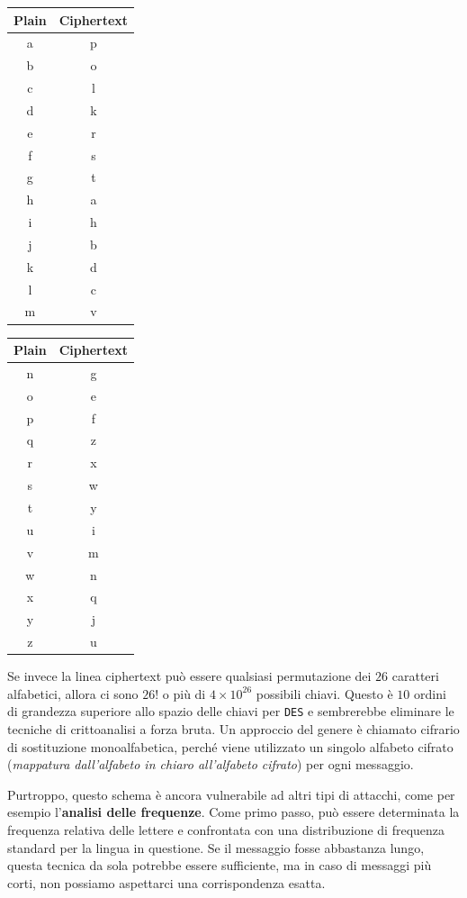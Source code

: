 \begin{center}
\begin{tabular}{|c|c|}
\hline
\textbf{Plain} & \textbf{Ciphertext} \\
\hline
    a & p \\
    b & o \\
    c & l \\
    d & k \\
    e & r \\
    f & s \\
    g & t \\
    h & a \\
    i & h \\
    j & b \\
    k & d \\
    l & c \\
    m & v \\
\hline
\end{tabular}
\hspace{2cm}
\begin{tabular}{|c|c|}
\hline
\textbf{Plain} & \textbf{Ciphertext} \\
\hline
    n & g \\
    o & e \\
    p & f \\
    q & z \\
    r & x \\
    s & w \\
    t & y \\
    u & i \\
    v & m \\
    w & n \\
    x & q \\
    y & j \\
    z & u \\
    \hline
\end{tabular}
\end{center}

Se invece la linea ciphertext può essere qualsiasi permutazione
dei $26$ caratteri alfabetici, allora ci sono $26!$ o più di $4 \times 10^{26}$
possibili chiavi. Questo è $10$ ordini di grandezza superiore allo
spazio delle chiavi per \verb|DES| e sembrerebbe eliminare le tecniche di
crittoanalisi a forza bruta. Un approccio del genere è chiamato
cifrario di sostituzione monoalfabetica, perché viene utilizzato
un singolo alfabeto cifrato (\textit{mappatura dall'alfabeto in chiaro
all'alfabeto cifrato}) per ogni messaggio.

Purtroppo, questo schema è ancora vulnerabile ad altri tipi di attacchi,
come per esempio l'\textbf{analisi delle frequenze}.
Come primo passo, può essere determinata la frequenza relativa delle
lettere e confrontata con una distribuzione di frequenza standard per
la lingua in questione.
Se il messaggio fosse abbastanza lungo, questa tecnica da sola potrebbe
essere sufficiente, ma in caso di messaggi più corti,
non possiamo aspettarci una corrispondenza esatta.

